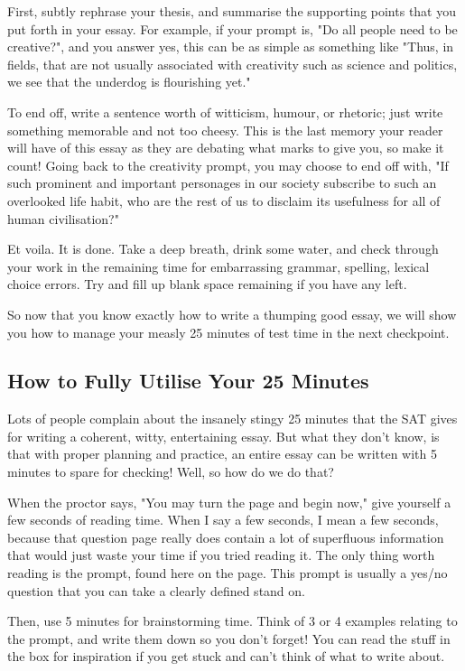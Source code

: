 First, subtly rephrase your thesis, and summarise the supporting points that you put forth in your essay. For example, if your prompt is, "Do all people need to be creative?", and you answer yes, this can be as simple as something like "Thus, in fields, that are not usually associated with creativity such as science and politics, we see that the underdog is flourishing yet."

To end off, write a sentence worth of witticism, humour, or rhetoric; just write something memorable and not too cheesy. This is the last memory your reader will have of this essay as they are debating what marks to give you, so make it count! Going back to the creativity prompt, you may choose to end off with, "If such prominent and important personages in our society subscribe to such an overlooked life habit, who are the rest of us to disclaim its usefulness for all of human civilisation?"

Et voila. It is done. Take a deep breath, drink some water, and check through your work in the remaining time for embarrassing grammar, spelling, lexical choice errors. Try and fill up blank space remaining if you have any left.

So now that you know exactly how to write a thumping good essay, we will show you how to manage your measly 25 minutes of test time in the next checkpoint.
\subsection{How to Fully Utilise Your 25 Minutes}
Lots of people complain about the insanely stingy 25 minutes that the SAT gives for writing a coherent, witty, entertaining essay. But what they don't know, is that with proper planning and practice, an entire essay can be written with 5 minutes to spare for checking! Well, so how do we do that?

When the proctor says, "You may turn the page and begin now," give yourself a few seconds of reading time. When I say a few seconds, I mean a few seconds, because that question page really does contain a lot of superfluous information that would just waste your time if you tried reading it. The only thing worth reading is the prompt, found here on the page. This prompt is usually a yes/no question that you can take a clearly defined stand on. 

Then, use 5 minutes for brainstorming time. Think of 3 or 4 examples relating to the prompt, and write them down so you don't forget! You can read the stuff in the box for inspiration if you get stuck and can't think of what to write about. 

